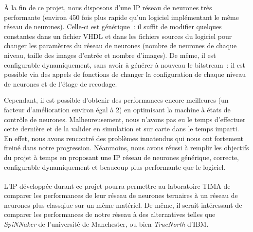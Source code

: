 \` {A} la fin de ce projet, nous disposons d'une IP réseau de neurones très performante (environ 450 fois plus rapide
qu'un logiciel implémentant le même réseau de neurones). Celle-ci est générique~: il suffit de modifier quelques constantes
dans un fichier VHDL et dans les fichiers sources du logiciel pour changer les paramètres du réseau de neurones (nombre de neurones
de chaque niveau, taille des images d'entrée et nombre d'images). De même, il est configurable dynamiquement, sans avoir à
générer à nouveau le bitstream~:
il est possible via des appels de fonctions de changer la configuration de chaque niveau de neurones et de l'étage de recodage.

Cependant, il est possible d'obtenir des performances encore meilleures (un facteur d'amélioration environ égal à 2) en optimisant la machine à
états de contrôle de neurones. Malheureusement, nous n'avons pas eu le temps d'effectuer cette dernière et de la valider en simulation et sur carte
dans le temps imparti. En effet, nous avons rencontré des problèmes innatendus qui nous ont fortement freiné dans notre progression.
Néanmoins, nous avons réussi à remplir les objectifs du projet à temps en proposant une IP réseau de neurones générique, correcte,
configurable dynamiquement et beaucoup plus performante que le logiciel.\\
~\\
L'IP développée durant ce projet pourra permettre au laboratoire TIMA de comparer les performances
de leur réseau de neurones ternaires à un réseau de neurones plus classqiue sur un même matériel.
De même, il serait intéressant de comparer les performances de notre réseau à des alternatives
telles que {\em SpiNNaker\cite{painkras2013spinnaker}} de l'université de Manchester, ou bien {\em TrueNorth} d'IBM.
